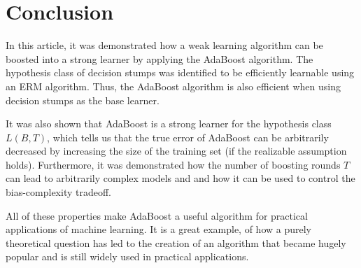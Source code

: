 \section{Conclusion}
\label{conclusion}

In this article, it was demonstrated how a weak learning algorithm can be boosted into a strong learner by applying the
AdaBoost algorithm.
The hypothesis class of decision stumps was identified to be efficiently learnable using an ERM algorithm.
Thus, the AdaBoost algorithm is also efficient when using decision stumps as the base learner.

It was also shown that AdaBoost is a strong learner for the hypothesis class $L(B, T)$, which tells us
that the true error of AdaBoost can be arbitrarily decreased by increasing the size of the training set
(if the realizable assumption holds).
Furthermore, it was demonstrated how the number of boosting rounds $T$ can lead to arbitrarily complex models and
and how it can be used to control the bias-complexity tradeoff.

All of these properties make AdaBoost a useful algorithm for practical applications of machine learning.
It is a great example, of how a purely theoretical question has led to the creation of an algorithm that became 
hugely popular and is still widely used in practical applications.
